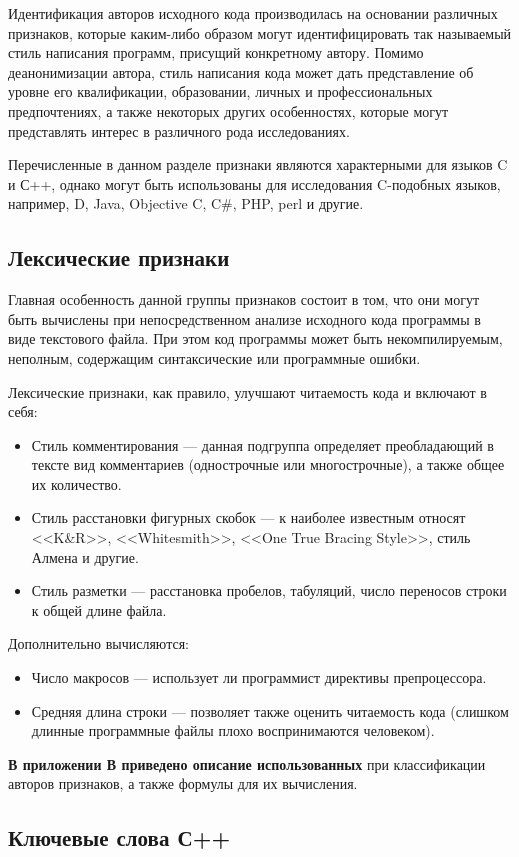 Идентификация авторов исходного кода производилась на основании различных признаков, которые каким-либо 
образом могут идентифицировать так называемый стиль написания программ, присущий конкретному автору. 
Помимо деанонимизации автора, стиль написания кода может дать представление об уровне его квалификации, 
образовании, личных и профессиональных предпочтениях, а также некоторых других особенностях, которые могут 
представлять интерес в различного рода исследованиях. 

Перечисленные в данном разделе признаки являются характерными для языков C и С++, однако могут быть 
использованы для исследования C-подобных языков, например, D, Java, Objective C, C\#, PHP, perl и другие.

\subsection{Лексические признаки}

Главная особенность данной группы признаков состоит в том, что они могут быть вычислены при 
непосредственном анализе исходного кода программы в виде текстового файла. 
При этом код программы может быть некомпилируемым, неполным, содержащим
синтаксические или программные ошибки.

Лексические признаки, как правило, улучшают читаемость кода и включают в себя:

\begin{itemize}
 \item Стиль комментирования --- данная подгруппа определяет преобладающий в тексте вид комментариев 
 (однострочные или многострочные), а также общее их количество.
 \item Стиль расстановки фигурных скобок --- к наиболее известным относят <<K\&R>>, <<Whitesmith>>,
 <<One True Bracing Style>>, стиль Алмена и другие.~\cite{bracing_styles} 
 \item Стиль разметки --- расстановка пробелов, табуляций, число переносов строки к общей длине файла.
\end{itemize}


Дополнительно вычисляются:
\begin{itemize}
 \item Число макросов --- использует ли программист директивы препроцессора.\cite{macros}
 \item Средняя длина строки --- позволяет также оценить читаемость кода (слишком длинные программные файлы
 плохо воспринимаются человеком).
\end{itemize}


\textbf{В приложении В приведено описание использованных} при классификации авторов 
признаков, а также формулы для их вычисления.



\clearpage
\subsection{Ключевые слова С++}\label{keycpp}
